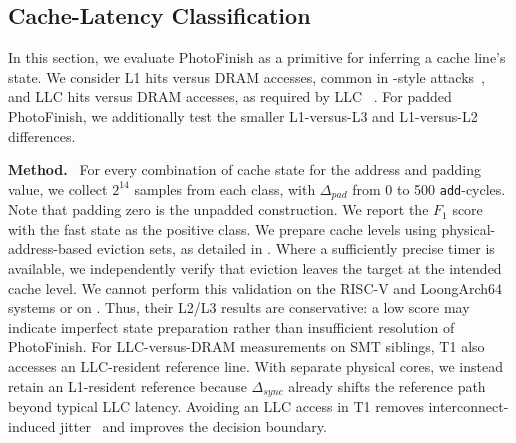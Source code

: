 \documentclass[letterpaper,twocolumn,10pt]{article} %
\newcommand{\paragrabf}[1]{\noindent \textbf{#1.}\ }
\newcommand{\AttackName}{PhotoFinish\xspace}
\newcommand{\tref}{{\fontfamily{cmtt}\selectfont T1}\xspace}
\newcommand{\rdelta}[1]{$\Delta_{#1}$}
\begin{document}
\subsection{Cache-Latency Classification}\label{subsec:measuring-memory-access-latencies}

In this section, we evaluate \AttackName as a primitive for inferring a cache line's state.
We consider L1 hits versus DRAM accesses, common in \FlushReload-style attacks~\cite{Yarom2014Flush}, and LLC hits versus DRAM accesses, as required by LLC \PrimeProbe~\cite{Liu2015Last}.
For padded \AttackName, we additionally test the smaller L1-versus-L3 and L1-versus-L2 differences.

\paragrabf{Method}
For every combination of cache state for the address and padding value, we collect $2^{14}$ samples from each class, with \rdelta{pad} from \num{0} to \num{500} \texttt{add}-cycles.
Note that padding zero is the unpadded construction.
We report the $F_1$ score with the fast state as the positive class.
We prepare cache levels using physical-address-based eviction sets, as detailed in .
Where a sufficiently precise timer is available, we independently verify that eviction leaves the target at the intended cache level.
We cannot perform this validation on the RISC-V and LoongArch64 systems or on \labseventyoneCPU.
Thus, their L2/L3 results are conservative: a low score may indicate imperfect state preparation rather than insufficient resolution of \AttackName.
For LLC-versus-DRAM measurements on SMT siblings, \tref also accesses an LLC-resident reference line.
With separate physical cores, we instead retain an L1-resident reference because \rdelta{sync} already shifts the reference path beyond typical LLC latency.
Avoiding an LLC access in \tref removes interconnect-induced jitter~\cite{paccagnella2021lord} and improves the decision boundary.
\end{document}
